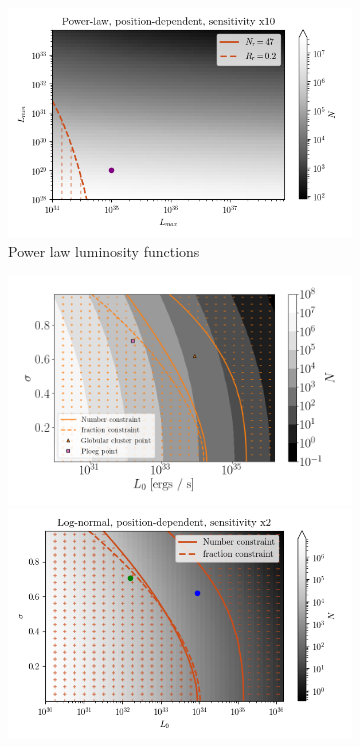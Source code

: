 \documentclass{C://Aliases//Dropbox-MIT//Latex_Templates//personal}
\begin{document}
\begin{figure}
\begin{subfigure}[t]{.45\textwidth}
        \includegraphics[width=.99\linewidth]{figs/power-law/power-law-pos-x10.png}
        \caption{Power law luminosity functions}
    \end{subfigure}%
    \hfill
    \begin{subfigure}[t]{.45\textwidth}
        \centering
        \includegraphics[width=.99\linewidth]{figs/log-normal/log-normal-pos-x1.png}
        \includegraphics[width=.99\linewidth]{figs/log-normal/log-normal-pos-x2.png}

\end{subfigure}
\end{figure}
\end{document}
